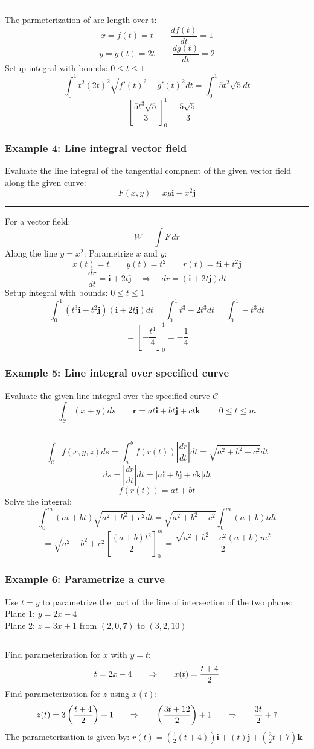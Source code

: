 \rule{\textwidth}{0.5pt}

The parmeterization of arc length over t:
$$x=f(t)=t\qquad \frac{df(t)}{dt}=1$$
$$y=g(t)=2t\qquad \frac{dg(t)}{dt}=2$$
Setup integral with bounds: $0\leq t\leq 1$
$$\int_0^1 t^2(2t)^2\sqrt{f'(t)^2+g'(t)^2}dt=\int_0^1 5t^2\sqrt{5}dt$$
$$=\left[\frac{5t^3\sqrt{5}}{3}\right]^1_0=\frac{5\sqrt{5}}{3}$$

\subsubsection{Example 4: Line integral vector field}
Evaluate the line integral of the tangential compnent of the given vector field along the given curve:
$$F(x,y)=xy\mathbf{i}-x^2\mathbf{j}$$
\rule{\textwidth}{0.5pt}

For a vector field:
$$W=\int F \,dr$$
Along the line $y=x^2$:
Parametrize $x$ and $y$:
$$x(t)=t\qquad y(t)=t^2\qquad r(t)=t\mathbf{i}+t^2\mathbf{j}$$
$$\frac{dr}{dt}=\mathbf{i}+2t\mathbf{j}\quad\Rightarrow\quad dr=(\mathbf{i}+2t\mathbf{j})dt$$
Setup integral with bounds: $0\leq t\leq 1$
$$\int_{0}^{1}(t^3\mathbf{i}-t^2\mathbf{j})(\mathbf{i}+2t\mathbf{j})  dt=\int_0^1t^3-2t^3dt=\int_0^1-t^3dt$$
$$=\left[-\frac{t^4}{4}\right]_0^1=-\frac{1}{4}$$

\subsubsection{Example 5: Line integral over specified curve}
Evaluate the given line integral over the specified curve $\mathcal{C}$
$$\textstyle\int_{\mathcal{C}}(x+y)ds\qquad \mathbf{r}=a t\mathbf{i}+b t\mathbf{j}+c t\mathbf{k}\qquad\ 0\leq t\leq m$$

\rule{\textwidth}{0.5pt}

$$\int_{\mathcal{C}}f(x,y,z)ds=\int_a^bf(r(t))\left|\frac{dr}{dt}\right|dt=\sqrt{a^2+b^2+c^2}dt$$
$$ds=\left|\frac{dr}{dt}\right|dt=|a\mathbf{i}+b\mathbf{j}+c\mathbf{k}|dt$$
$$f(r(t))=at+bt$$
Solve the integral:
$$\int_0^m(at+bt)\sqrt{a^2+b^2+c^2}dt=\sqrt{a^2+b^2+c^2}\int_0^m(a+b)tdt$$
$$=\sqrt{a^2+b^2+c^2}\left[\frac{(a+b)t^2}{2}\right]_0^m=\frac{\sqrt{a^2+b^2+c^2}(a+b)m^2}{2}$$
\subsubsection{Example 6: Parametrize a curve}
Use $t=y$ to parametrize the part of the line of intersection of the two planes:\\
Plane 1: $y=2x-4$\\
Plane 2: $z=3x+1$ from $(2,0,7)$ to $(3,2,10)$

\rule{\textwidth}{0.5pt}

Find parameterization for $x$ with $y=t$:
$$t=2x-4 {\qquad\Rightarrow\qquad} x(t)=\frac{t+4}{2}$$
Find parameterization for $z$ using $x(t)$:
$$z(t)=3\left(\frac{t+4}{2}\right)+1{\qquad\Rightarrow\qquad} \left(\frac{3t+12}{2}\right)+1{\qquad\Rightarrow\qquad} \frac{3t}{2}+7$$
The parameterization is given by:
$r(t)=\left(\frac{1}{2}(t+4)\right)\mathbf{i}+(t)\mathbf{j}+\left(\frac{3}{2}t+7\right)\mathbf{k}$
